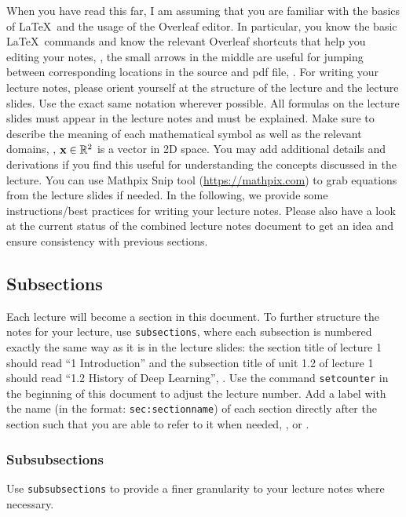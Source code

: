 \documentclass{article}
\begin{document}
When you have read this far, I am assuming that you are familiar with the basics of \LaTeX~and the usage of the Overleaf editor. In particular, you know the basic \LaTeX~commands and know the relevant Overleaf shortcuts that help you editing your notes, \eg, the small arrows in the middle are useful for jumping between corresponding locations in the source and pdf file, \etc. For writing your lecture notes, please orient yourself at the structure of the lecture and the lecture slides. Use the exact same notation wherever possible. All formulas on the lecture slides must appear in the lecture notes and must be explained. Make sure to describe the meaning of each mathematical symbol as well as the relevant domains, \eg, $\mathbf{x} \in \mathbb{R}^2$ is a vector in 2D space. You may add additional details and derivations if you find this useful for understanding the concepts discussed in the lecture. You can use Mathpix Snip tool (\url{https://mathpix.com}) to grab equations from the lecture slides if needed. In the following, we provide some instructions/best practices for writing your lecture notes. Please also have a look at the current status of the combined lecture notes document to get an idea and ensure consistency with previous sections.

\subsection{Subsections}
\label{sec:subsections}

Each lecture will become a section in this document. To further structure the notes for your lecture, use \texttt{subsections}, where each subsection is numbered exactly the same way as it is in the lecture slides: the section title of lecture 1 should read ``1 Introduction'' and the subsection title of unit 1.2 of lecture 1 should read ``1.2 History of Deep Learning'', \etc. Use the command \texttt{setcounter} in the beginning of this document to adjust the lecture number. Add a label with the name (in the format: \texttt{sec:sectionname}) of each section directly after the section such that you are able to refer to it when needed, \eg,  or .

\subsubsection{Subsubsections}
\label{sec:subsubsections}

Use \texttt{subsubsections} to provide a finer granularity to your lecture notes where necessary.
\end{document}
